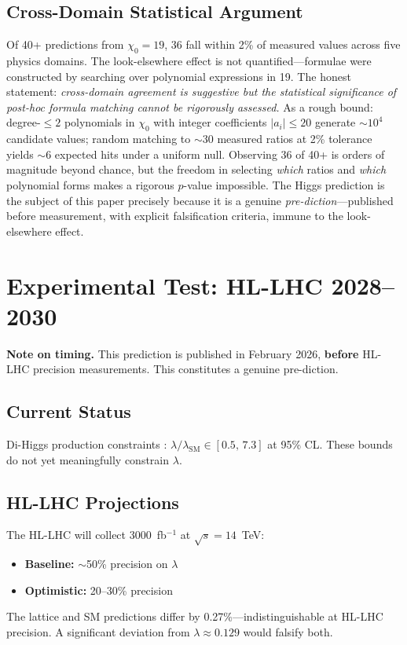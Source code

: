 \documentclass[12pt,a4paper]{article}
\newcommand{\chizero}{\chi_0}
\newcommand{\lambdaSM}{\lambda_{\mathrm{SM}}}
\begin{document}
\subsection{Cross-Domain Statistical Argument}

Of 40+ predictions from $\chizero = 19$, 36 fall within 2\% of measured values across five physics domains. The look-elsewhere effect is not quantified---formulae were constructed by searching over polynomial expressions in 19. The honest statement: \textit{cross-domain agreement is suggestive but the statistical significance of post-hoc formula matching cannot be rigorously assessed.} As a rough bound: degree-$\leq 2$ polynomials in $\chizero$ with integer coefficients $|a_i| \leq 20$ generate $\sim\!10^4$ candidate values; random matching to $\sim\!30$ measured ratios at 2\% tolerance yields $\sim\!6$ expected hits under a uniform null. Observing 36 of 40+ is orders of magnitude beyond chance, but the freedom in selecting \textit{which} ratios and \textit{which} polynomial forms makes a rigorous $p$-value impossible. The Higgs prediction is the subject of this paper precisely because it is a genuine \textit{pre-diction}---published before measurement, with explicit falsification criteria, immune to the look-elsewhere effect.


\section{Experimental Test: HL-LHC 2028--2030}\label{sec:experiment}

\textbf{Note on timing.} This prediction is published in February 2026, \textbf{before} HL-LHC precision measurements. This constitutes a genuine pre-diction.

\subsection{Current Status}

Di-Higgs production constraints \citep{ATLAS2022HH,CMS2022HH}: $\lambda/\lambdaSM \in [0.5,\, 7.3]$ at 95\% CL. These bounds do not yet meaningfully constrain $\lambda$.

\subsection{HL-LHC Projections}

The HL-LHC \citep{HLLHC2019} will collect 3000~fb$^{-1}$ at $\sqrt{s} = 14$~TeV:
\begin{itemize}
\item \textbf{Baseline:} $\sim$50\% precision on $\lambda$
\item \textbf{Optimistic:} 20--30\% precision
\end{itemize}
The lattice and SM predictions differ by 0.27\%---indistinguishable at HL-LHC precision. A significant deviation from $\lambda \approx 0.129$ would falsify both.
\end{document}

